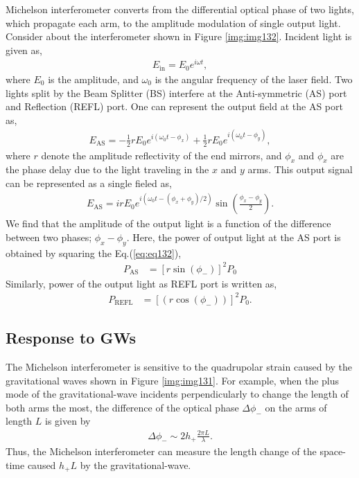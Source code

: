 Michelson interferometer converts from the differential optical phase of two lights, which propagate each arm, to the amplitude modulation of single output light. Consider about the interferometer shown in Figure  \ref{img:img132}. Incident light is given as,
\begin{eqnarray}
  E_{\mathrm{in}} = E_{0} e^{i\omega{t}},
\end{eqnarray}
where $E_0$ is the amplitude, and $\omega_0$ is the angular frequency of the laser field. 
Two lights split by the Beam Splitter (BS) interfere at the Anti-symmetric (AS) port and Reflection (REFL) port. One can represent the output field at the AS port  as,
\begin{eqnarray}
  E_{\mathrm{AS}} = -\frac{1}{2}rE_{0} e^{i\left(\omega_{0} t-\phi_{x}\right)}+\frac{1}{2}r E_{0} e^{i\left(\omega_{0} t-\phi_{y}\right)},
\end{eqnarray}
where $r$ denote the amplitude reflectivity of the end mirrors, and $\phi_{x}$ and $\phi_{x}$ are the phase delay due to the light traveling in the $x$ and $y$ arms. This output signal can be represented as a single fieled as,
\begin{eqnarray}
E_{\mathrm{AS}} = i r E_{0} e^{i\left(\omega_{0} t-\left(\phi_{x}+\phi_{y}\right) / 2\right)} \sin \left(\frac{\phi_{x}-\phi_{y}}{2}\right). \label{eq:eq132}
\end{eqnarray} 
We find that the amplitude of the output light is a function of the difference between two phases; $\phi_{x}-\phi_{y}$. Here, the power of output light at the AS port is obtained by squaring the Eq.(\ref{eq:eq132}), 
\begin{eqnarray}
  P_{\mathrm{AS}} &=\left[r\sin({\phi_{-}})\right]^2P_0  \label{eq:eq133}
\end{eqnarray}
Similarly, power of the output light as REFL port is written as,
\begin{eqnarray}
  P_{\mathrm{REFL}} &=\left[(r\cos({\phi_{-}}))\right]^2P_0. \label{eq:eq134}
\end{eqnarray}

\subsection{Response to GWs} \label{sec:sec122}
The Michelson interferometer is sensitive to the quadrupolar strain caused by the gravitational waves shown in Figure \ref{img:img131}. For example, when the plus mode of the gravitational-wave incidents perpendicularly to change the length of both arms the most, the difference of the optical phase $\Delta{\phi_{-}}$ on the arms of length $L$ is given by \cite{Adhikari2014}
\begin{eqnarray}
  \Delta{\phi_{-}} \sim 2h_{+}\frac{2\pi{L}}{\lambda}. \label{eq:eq_}
\end{eqnarray}
Thus, the Michelson interferometer can measure the length change of the space-time caused $h_{+}L$ by the gravitational-wave.

